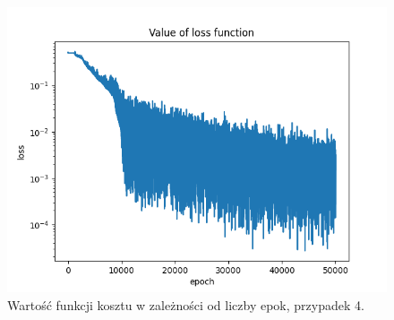 \documentclass[11pt, leqno]{scrartcl}
\begin{document}
    \begin{figure}[H]
        \centering
        \includegraphics[width=0.7\linewidth]{nn_b3_loss.png}
        \caption{Wartość funkcji kosztu w zależności od liczby epok,
            przypadek 4.}
    \end{figure}
\end{document}
